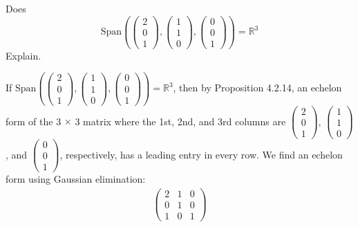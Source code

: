 \documentclass[12pt]{article}
\newenvironment{problem}[2][Problem]
{
	\begin{trivlist} 
		\item[\hskip \labelsep {\bfseries #1 #2:}]
	}
{
	\end{trivlist}
	}
\newenvironment{solution}[1][Solution]
{
	\begin{trivlist} 
		\item[\hskip \labelsep {\itshape #1:}]
	}
	{
	\end{trivlist}
}
\begin{document}
\begin{problem}{1}
Does
\[
\text{Span}\left(\begin{pmatrix}2\\0\\1\end{pmatrix}, \begin{pmatrix}1\\1\\0\end{pmatrix}, \begin{pmatrix}0\\0\\1\end{pmatrix}\right)=\mathbb{R}^3
\]
Explain.
\noindent
\newline
\newline
\begin{solution}
If $\text{Span}\left(\begin{pmatrix}2\\0\\1\end{pmatrix}, \begin{pmatrix}1\\1\\0\end{pmatrix}, \begin{pmatrix}0\\0\\1\end{pmatrix}\right)=\mathbb{R}^3$, then by Proposition 4.2.14, an echelon form of the 3 $\times$ 3 matrix where the 1st, 2nd, and 3rd columns are $\begin{pmatrix}2\\0\\1\end{pmatrix}$, $ \begin{pmatrix}1\\1\\0\end{pmatrix}$, and $\begin{pmatrix}0\\0\\1\end{pmatrix}$, respectively, has a leading entry in every row. We find an echelon form using Gaussian elimination:
\begin{align*}
\begin{pmatrix}2&1&0\\0&1&0\\1&0&1\end{pmatrix}

\end{align*}
\end{solution}
\end{problem}
\end{document}
